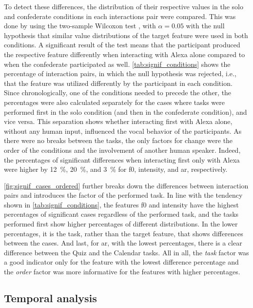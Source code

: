 To detect these differences, the distribution of their respective values in the solo and confederate conditions in each interactions pair were compared.
This was done by using the two-sample Wilcoxon test \citep{Wilcoxon1945individual}, with $\alpha = 0.05$ with the null hypothesis that similar value distributions of the target feature were used in both conditions.
A significant result of the test means that the participant produced the respective feature differently when interacting with Alexa alone compared to when the confederate participated as well.
\cref{tab:signif_conditions} shows the percentage of interaction pairs, in which the null hypothesis was rejected, i.e., that the feature was utilized differently by the participant in each condition.
Since chronologically, one of the conditions needed to precede the other, the percentages were also calculated separately for the cases where tasks were performed first in the solo condition (and then in the confederate condition), and vice versa.
This separation shows whether interacting first with Alexa alone, without any human input, influenced the vocal behavior of the participants.
As there were no breaks between the tasks, the only factors for change were the order of the conditions and the involvement of another human speaker.
Indeed, the percentages of significant differences when interacting first only with Alexa were higher by \SI{12}{\percent}, \SI{20}{\percent}, and \SI{3}{\percent} for \ac{f0}, intensity, and \ac{ar}, respectively.

\cref{fig:signif_cases_ordered} further breaks down the differences between interaction pairs and introduces the factor of the performed task.
In line with the tendency shown in \cref{tab:signif_conditions}, the features \ac{f0} and intensity have the highest percentages of significant cases regardless of the performed task, and the tasks performed first show higher percentages of different distributions.
In the lower percentages, it is the task, rather than the target feature, that shows differences between the cases.
And last, for \ac{ar}, with the lowest percentages, there is a clear difference between the Quiz and the Calendar tasks.
All in all, the \emph{task} factor was a good indicator only for the feature with the lowest difference percentage and the \emph{order} factor was more informative for the features with higher percentages.

\subsection{Temporal analysis}
\label{subsec:temporal_analysis}

